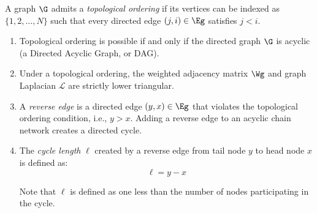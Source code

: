 \begin{definition}\label{def:topological_ordering}
A graph $\G$ admits a \emph{topological ordering} if its vertices can be indexed as $\{1, 2, \dots, N \}$ such that every directed edge $(j, i) \in \Eg$ satisfies $j < i$.
\begin{enumerate}
    \item Topological ordering is possible if and only if the directed graph $\G$ is acyclic (a Directed Acyclic Graph, or DAG).
    \item Under a topological ordering, the weighted adjacency matrix $\Wg$ and graph Laplacian $\mathcal{L}$ are strictly lower triangular.
    \item A \emph{reverse edge} is a directed edge $(y, x) \in \Eg$ that violates the topological ordering condition, i.e., $y > x$. Adding a reverse edge to an acyclic chain network creates a directed cycle.
    \item The \emph{cycle length} $\ell$ created by a reverse edge from tail node $y$ to head node $x$ is defined as:
    \begin{equation}\label{eq:cycle_length_def}
        \ell = y - x
    \end{equation}
    \begin{remark}
        Note that $\ell$ is defined as one less than the number of nodes participating in the cycle.
    \end{remark}
\end{enumerate}
\end{definition}
